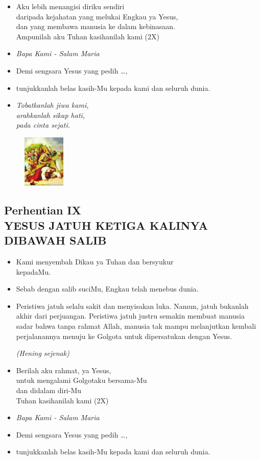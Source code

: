 \documentclass[a5paper,headsepline,titlepage,11pt,nnormalheadings,DIVcalc]{scrbook}
\newcommand{\BU}[1]{\begin{itemize} \item[U:] #1 \end{itemize}}
\newcommand{\BP}[1]{\begin{itemize} \item[P:] #1 \end{itemize}}
\newcommand{\kamiMenyembah}{\BP{ Kami menyembah Dikau ya Tuhan dan bersyukur\\kepadaMu.}
\BU{ Sebab dengan salib suciMu, Engkau telah menebus dunia.}
}
\newcommand{\kasihanilahKami}{\BP{Demi sengsara Yesus yang pedih \ldots,}
\BU{tunjukkanlah belas kasih-Mu kepada kami dan seluruh dunia.}}
\def\hening{\par \textit{(Hening sejenak)}}
\begin{document}
\BU{Aku lebih menangisi diriku sendiri\\ daripada kejahatan yang melukai Engkau ya Yesus,\\ dan yang membawa manusia ke dalam kebinasaan.\\ Ampunilah aku
Tuhan kasihanilah kami (2X)
}

\large\begin{itemize}\item[~]\it{Bapa Kami - Salam Maria}\end{itemize}\normalsize
\kasihanilahKami

\begin{itemize}
\item[9.] \it{Tobatkanlah jiwa kami, \\
	arahkanlah sikap hati,\\ 
	pada cinta sejati. 
}
\end{itemize}

\begin{figure}
\includegraphics[width=2cm]{jalansalib_files/09_small.jpg}
\end{figure}
\subsection*{Perhentian IX\\
YESUS JATUH KETIGA KALINYA DIBAWAH SALIB}

\kamiMenyembah

\BP{Peristiwa jatuh selalu sakit dan menyisakan luka. Namun, jatuh bukanlah akhir dari perjuangan. Peristiwa jatuh justru semakin membuat manusia sadar bahwa tanpa rahmat Allah, manusia tak mampu melanjutkan kembali perjalanannya menuju ke Golgota untuk dipersatukan dengan Yesus.
\hening
}

\BU{Berilah aku rahmat, ya Yesus,\\ untuk mengalami Golgotaku bersama-Mu\\ dan didalam diri-Mu\\
Tuhan kasihanilah kami (2X)
}

\large\begin{itemize}\item[~]\it{Bapa Kami - Salam Maria}\end{itemize}\normalsize
\kasihanilahKami
\end{document}

